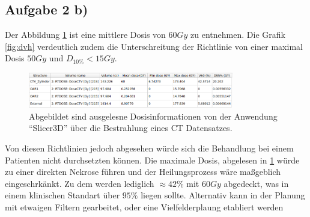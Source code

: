\subsection{Aufgabe 2 b)}
Der Abbildung \ref{fig:slicer} ist eine mittlere Dosis von $60 Gy$ zu entnehmen. Die Grafik \ref{fig:dvh} verdeutlich zudem die 
Unterschreitung der Richtlinie von einer maximal Dosis $50 Gy$ und $D_{10\%} < 15 Gy$. 
\begin{figure}
    \centering
    \includegraphics[width  = 0.8\textwidth]{content/slicer.png}
    \caption{Abgebildet sind ausgelesne Dosisinformationen von der Anwendung \enquote{Slicer3D} über die Bestrahlung eines CT Datensatzes.}
    \label{fig:slicer}
\end{figure}
\noindent
Von diesen Richtlinien jedoch abgesehen würde sich die Behandlung bei einem Patienten nicht durchsetzten können. 
Die maximale Dosis, abgelesen in \ref{fig:slicer} würde zu einer direkten Nekrose führen und der Heilungsprozess wäre maßgeblich 
eingeschrkänkt. Zu dem werden lediglich $\approx 42\%$ mit $60Gy$ abgedeckt, was in einem klinischen Standart über $95\%$ liegen sollte.
Alternativ kann in der Planung mit etwaigen Filtern gearbeitet, oder eine Vielfelderplaung etabliert werden
\newpage